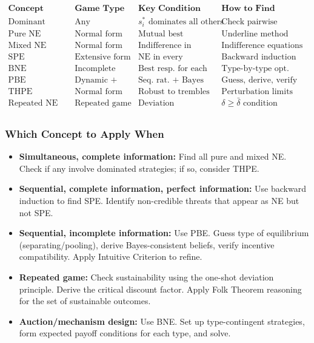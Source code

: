 \documentclass[hidelinks]{article}
\begin{document}
\[
\begin{array}{l|l|l|l}
\textbf{Concept} & \textbf{Game Type} & \textbf{Key Condition} & \textbf{How to Find} \\
\hline
\text{Dominant Strategy} & \text{Any} & s_i^* \text{ dominates all others} & \text{Check pairwise domination} \\
\text{Pure NE} & \text{Normal form} & \text{Mutual best responses} & \text{Underline method} \\
\text{Mixed NE} & \text{Normal form} & \text{Indifference in support} & \text{Indifference equations} \\
\text{SPE} & \text{Extensive form} & \text{NE in every subgame} & \text{Backward induction} \\
\text{BNE} & \text{Incomplete info} & \text{Best resp. for each type} & \text{Type-by-type opt.} \\
\text{PBE} & \text{Dynamic + types} & \text{Seq. rat. + Bayes beliefs} & \text{Guess, derive, verify} \\
\text{THPE} & \text{Normal form} & \text{Robust to trembles} & \text{Perturbation limits} \\
\text{Repeated NE} & \text{Repeated game} & \text{Deviation unprofitable} & \delta \geq \bar\delta \text{ condition} \\
\end{array}
\]

\subsubsection{Which Concept to Apply When}

\begin{itemize}
    \item \textbf{Simultaneous, complete information:} Find all pure and mixed NE. Check if any involve dominated strategies; if so, consider THPE.
    \item \textbf{Sequential, complete information, perfect information:} Use backward induction to find SPE. Identify non-credible threats that appear as NE but not SPE.
    \item \textbf{Sequential, incomplete information:} Use PBE. Guess type of equilibrium (separating/pooling), derive Bayes-consistent beliefs, verify incentive compatibility. Apply Intuitive Criterion to refine.
    \item \textbf{Repeated game:} Check sustainability using the one-shot deviation principle. Derive the critical discount factor. Apply Folk Theorem reasoning for the set of sustainable outcomes.
    \item \textbf{Auction/mechanism design:} Use BNE. Set up type-contingent strategies, form expected payoff conditions for each type, and solve.
\end{itemize}
\end{document}
